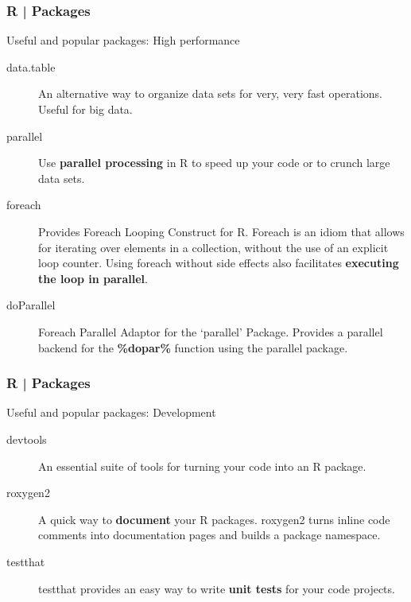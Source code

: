 \begin{frame}
  \frametitle{R | Packages}
  \begin{block}{Useful and popular packages: High performance}
    \begin{description}
      \item[\alert{data.table}] An alternative way to organize data sets for \alert{very, very fast} operations. Useful for big data.
      \item[parallel] Use \textbf{parallel processing} in R to speed up your code or to crunch large data sets.
      \item[\alert{foreach}] Provides Foreach Looping Construct for R. Foreach is an idiom that allows for iterating over elements in a collection, without the use of an explicit loop counter. Using foreach without side effects also facilitates \textbf{executing the loop in parallel}.
      \item[\alert{doParallel}] Foreach Parallel Adaptor for the `parallel' Package. Provides a parallel backend for the \textbf{\%dopar\%} function using the parallel package.
    \end{description}
  \end{block}
\end{frame}

\begin{frame}
  \frametitle{R | Packages}
  \begin{block}{Useful and popular packages: Development}
    \begin{description}
      \item[devtools] An essential suite of tools for turning your code into an R package.
      \item[roxygen2] A quick way to \textbf{document} your R packages. roxygen2 turns inline code comments into documentation pages and builds a package namespace.
      \item[testthat] testthat provides an easy way to write \textbf{unit tests} for your code projects.
    \end{description}
  \end{block}
\end{frame}

